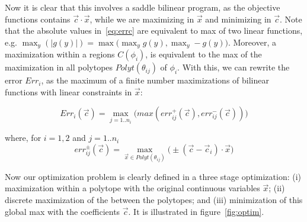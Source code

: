 Now it is clear that this involves a saddle bilinear program, as the objective functions contains $\vec{c} \cdot \vec{x}$, while we are maximizing in $\vec{x}$ and minimizing in $\vec{c}$. 
Note that the absolute values in~\ref{eq:errc} are equivalent to max of two linear functions, e.g. $\max_y (|g(y)|) = \max \big( \max_y g(y), \max_y -g(y) \big)$. Moreover, a maximization within a regions $C(\phi_i)$, is equivalent to the max of the maximization in all polytopes $Polyt(\theta_{ij})$ of $\phi_i$. With this, we can rewrite the error $Err_i$, as the maximum of a finite number maximizations of bilinear functions with linear constraints in $\vec{x}$:
{\footnotesize 
\vspace{-2mm}
\begin{equation} Err_i(\vec{c}) = \max_{j=1..n_i} \big( max ( err^+_{ij}(\vec{c}), err^-_{ij}(\vec{c}) ) \big) \label{eq:errcij} \end{equation}
\vspace{-5mm}

where, for $i=1,2$ and $j=1..n_i$
\vspace{-1mm}
\begin{equation} err^{\pm}_{ij}(\vec{c}) = \max_{\vec{x} \in Polyt(\theta_{ij})} \big( \pm(\vec{c} - \vec{c}_i)\cdot \vec{x} \big)  \label{eq:polymax} \end{equation}
\vspace{-2mm}
}

Now our optimization problem is clearly defined in a three stage optimization: (i) maximization within a polytope with the original continuous variables $\vec{x}$; (ii) discrete maximization of the between the polytopes; and (iii) minimization of this global max with the coefficients $\vec{c}$. It is illustrated in figure~\ref{fig:optim}.


